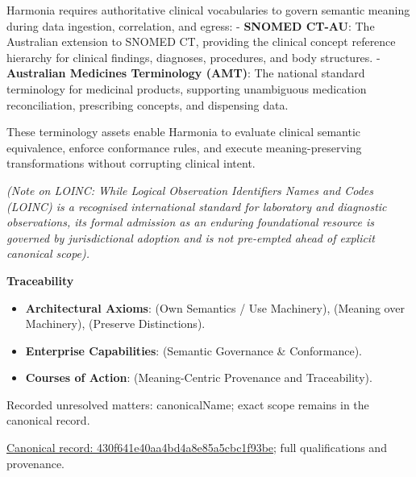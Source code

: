 Harmonia requires authoritative clinical vocabularies to govern semantic meaning during data ingestion, correlation, and egress:
- \textbf{SNOMED CT-AU}: The Australian extension to SNOMED CT, providing the clinical concept reference hierarchy for clinical findings, diagnoses, procedures, and body structures.
- \textbf{Australian Medicines Terminology (AMT)}: The national standard terminology for medicinal products, supporting unambiguous medication reconciliation, prescribing concepts, and dispensing data.



These terminology assets enable Harmonia to evaluate clinical semantic equivalence, enforce conformance rules, and execute meaning-preserving transformations without corrupting clinical intent.



\emph{(Note on LOINC: While Logical Observation Identifiers Names and Codes (LOINC) is a recognised international standard for laboratory and diagnostic observations, its formal admission as an enduring foundational resource is governed by jurisdictional adoption and is not pre-empted ahead of explicit canonical scope).}



\par\medskip\textbf{Traceability}\par


\begin{itemize}


\item \textbf{Architectural Axioms}: \texttt{} (Own Semantics / Use Machinery), \texttt{} (Meaning over Machinery), \texttt{} (Preserve Distinctions).

\item \textbf{Enterprise Capabilities}: \texttt{} (Semantic Governance \& Conformance).

\item \textbf{Courses of Action}: \texttt{} (Meaning-Centric Provenance and Traceability).

\end{itemize}

{\small Recorded unresolved matters: canonicalName; exact scope remains in the canonical record.}\par
{\footnotesize \href{../../../../continuum/strategy/resource/430f641e40aa4bd4a8e85a5cbc1f93be.md}{Canonical record: 430f641e40aa4bd4a8e85a5cbc1f93be}; full qualifications and provenance.}\par
